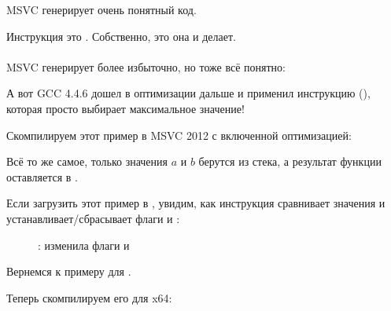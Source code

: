 


\Optimizing MSVC генерирует очень понятный код.

Инструкция  это . Собственно, это она и делает.\\
\\
\NonOptimizing MSVC генерирует более избыточно, но тоже всё понятно:



А вот GCC 4.4.6 дошел в оптимизации дальше и применил инструкцию  (), которая просто выбирает максимальное значение!



\clearpage
{}

Скомпилируем этот пример в MSVC 2012 с включенной оптимизацией:



Всё то же самое, только значения $a$ и $b$ 
берутся из стека, а результат функции оставляется в .

Если загрузить этот пример в \olly, 
увидим, как инструкция  сравнивает значения и устанавливает/сбрасывает
флаги \CF и \PF:

\begin{figure}[H]
\centering
{}
\caption{\olly:  изменила флаги \CF и \PF}
\label{fig:FPU_SIMD_d_max_olly}
\end{figure}

\label{machine_epsilon_x64_and_SIMD}

Вернемся к примеру  для \Tdouble {}.

Теперь скомпилируем его для x64:



